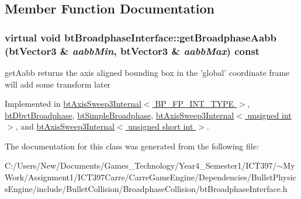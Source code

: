 \subsection{Member Function Documentation}
\hypertarget{classbt_broadphase_interface_b5af9e26414f5a72a76040b8fab4d9e2}{
\subsubsection[getBroadphaseAabb]{\setlength{\rightskip}{0pt plus 5cm}virtual void btBroadphaseInterface::getBroadphaseAabb (btVector3 \& {\em aabbMin}, \/  btVector3 \& {\em aabbMax}) const}}
\label{classbt_broadphase_interface_b5af9e26414f5a72a76040b8fab4d9e2}


getAabb returns the axis aligned bounding box in the 'global' coordinate frame will add some transform later 

Implemented in \hyperlink{classbt_axis_sweep3_internal_5f343e29ce818d0b96cb11260bca2a68}{btAxisSweep3Internal$<$ BP\_\-FP\_\-INT\_\-TYPE $>$}, \hyperlink{structbt_dbvt_broadphase_32ab55b5ef2616d0cc039cd037c05d7f}{btDbvtBroadphase}, \hyperlink{classbt_simple_broadphase_8753363773ebbfeb48f8cf5594429dc2}{btSimpleBroadphase}, \hyperlink{classbt_axis_sweep3_internal_5f343e29ce818d0b96cb11260bca2a68}{btAxisSweep3Internal$<$ unsigned int $>$}, and \hyperlink{classbt_axis_sweep3_internal_5f343e29ce818d0b96cb11260bca2a68}{btAxisSweep3Internal$<$ unsigned short int $>$}.

The documentation for this class was generated from the following file:\begin{CompactItemize}
\item 
C:/Users/New/Documents/Games\_\-Technology/Year4\_\-Semester1/ICT397/$\sim$My Work/Assignment1/ICT397Carre/CarreGameEngine/Dependencies/BulletPhysicsEngine/include/BulletCollision/BroadphaseCollision/btBroadphaseInterface.h\end{CompactItemize}
